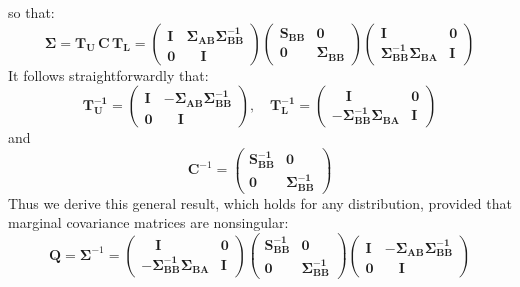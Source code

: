 \documentclass[openany]{book}
\begin{document}
 so that:
$$
\mathbf{\Sigma} = \mathbf{T_U} \, \mathbf{C} \, \mathbf{T_L} =
 \left( \begin{array}{ll} 
	\mathbf{I} &  \mathbf{\Sigma_{AB}} \mathbf{\Sigma_{BB}^{-1}}
	\\ \mathbf{0} & \quad \mathbf{I} \quad
\end{array}
\right)
\left( \begin{array}{ll} 
	\mathbf{S_{BB}}   & \mathbf{0}\\ 
	\mathbf{0}  & \mathbf{\Sigma_{BB}}
\end{array} \right)
\left( \begin{array}{ll} 
	\mathbf{I} & \mathbf{0}\\ 
	\mathbf{\Sigma_{BB}^{-1}} \mathbf{\Sigma_{BA}} & \mathbf{I}
\end{array}
\right)
$$
It follows straightforwardly that:
$$
\mathbf{T_U^{-1}} =  
\left( \begin{array}{ll} 
	\mathbf{I} & - \mathbf{\Sigma_{AB}} \mathbf{\Sigma_{BB}^{-1}}
	\\ \mathbf{0} & \quad \mathbf{I} \quad
\end{array}
\right), \quad
\mathbf{T_L^{-1}} = 
\left( \begin{array}{ll} 
	\quad \mathbf{I} & \mathbf{0}\\ 
	- \mathbf{\Sigma_{BB}^{-1}} \mathbf{\Sigma_{BA}} & \mathbf{I}
\end{array}
\right)
$$ and $$
\mathbf{C}^{-1} = 
\left( \begin{array}{ll} 
	\mathbf{S_{BB}^{-1}}   & \mathbf{0}\\ 
	\mathbf{0}  & \mathbf{\Sigma_{BB}^{-1}}
\end{array} \right)
$$
Thus we derive this general result, which holds for any distribution, provided that marginal covariance matrices are nonsingular:
\begin{equation}
	\mathbf{Q} = \mathbf{\Sigma}^{-1} = 
	\left( \begin{array}{ll} 
		\quad \mathbf{I} & \mathbf{0}\\ 
		- \mathbf{\Sigma_{BB}^{-1}} \mathbf{\Sigma_{BA}} & \mathbf{I}
	\end{array}
	\right)
	\left( \begin{array}{ll} 
		\mathbf{S_{BB}^{-1}}   & \mathbf{0}\\ 
		\mathbf{0}  & \mathbf{\Sigma_{BB}^{-1}}
	\end{array} \right)
    \left( \begin{array}{ll} 
    	\mathbf{I} & - \mathbf{\Sigma_{AB}} \mathbf{\Sigma_{BB}^{-1}}\\ 
    	\mathbf{0} & \quad \mathbf{I} \quad
    \end{array} \right)
\label{eq:precision1}
\end{equation}
\end{document}
